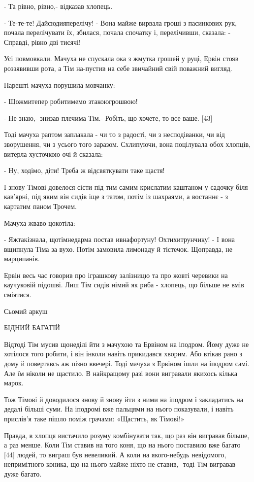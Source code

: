 - Та рівно, рівно,- відказав хлопець.

- Те-те-те! Дайсюдияперелічу! - Вона майже вирвала гроші з пасинкових рук, почала перелічувати їх, збилася, почала спочатку і, перелічивши, сказала: - Справді, рівно дві тисячі!

Усі повмовкали. Мачуха не спускала ока з жмутка грошей у руці, Ервін стояв роззявивши рота, а Тім на-пустив на себе звичайний свій поважний вигляд.

Нарешті мачуха порушила мовчанку:

- Щожмитепер робитимемо зтакоюгрошвою!

- Не знаю,- знизав плечима Тім.- Робіть, що хочете, то все ваше. [43]

Тоді мачуха раптом заплакала - чи то з радості, чи з несподіванки, чи від зворушення, чи з усього того заразом. Схлипуючи, вона поцілувала обох хлопців, витерла хусточкою очі й сказала:

- Ну, ходімо, діти! Треба ж відсвяткувати таке щастя!

І знову Тімові довелося сісти під тим самим крислатим каштаном у садочку біля кав'ярні, під яким він сидів іще з татом, потім із шахраями, а востаннє - з картатим паном Трочем.

Мачуха жваво цокотіла:

- Яжтакізнала, щотімнедарма постав ивнафортуну! Охтихитрунчику! - І вона вщипнула Тіма за вухо. Потім замовила лимонаду й тістечок. Щоправда, не марципанів.

Ервін весь час говорив про іграшкову залізницю та про жовті черевики на каучуковій підошві. Лиш Тім сидів німий як риба - хлопець, що більше не вмів сміятися.

Сьомий аркуш

БІДНИЙ БАГАТІЙ

Відтоді Тім мусив щонеділі йти з мачухою та Ервіном на іподром. Йому дуже не хотілося того робити, і він інколи навіть прикидався хворим. Або втікав рано з дому й повертавсь аж пізно ввечері. Тоді мачуха з Ервіном ішли на іподром самі. Але їм ніколи не щастило. В найкращому разі вони вигравали якихось кілька марок.

Тож Тімові й доводилося знову й знову йти з ними на іподром і закладатись на дедалі більші суми. На іподромі вже пальцями на нього показували, і навіть прислів'я таке пішло поміж грачами: «Щастить, як Тімові!»

Правда, в хлопця вистачило розуму комбінувати так, що раз він вигравав більше, а раз менше. Коли Тім ставив на того коня, що на нього поставило вже багато [44] людей, то виграш був невеликий. А коли на якого-небудь невідомого, непримітного коника, що на нього майже ніхто не ставив,- тоді Тім вигравав дуже багато.

